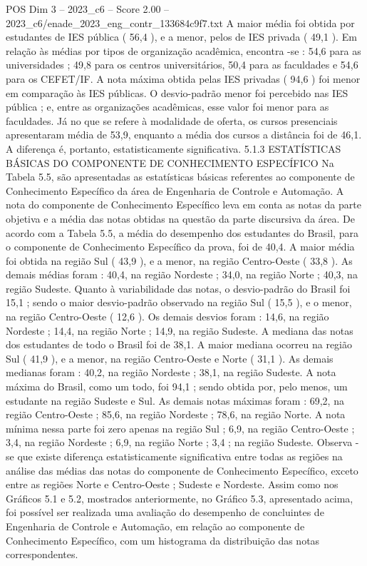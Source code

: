\begin{textsample}{POS Dim 3 – 2023\_c6 – Score 2.00 – 2023\_c6/enade\_2023\_eng\_contr\_133684c9f7.txt}
A maior média foi obtida por estudantes de IES pública ( 56,4 ), e a menor, pelos de IES privada ( 49,1 ).
Em relação às médias por tipos de organização acadêmica, encontra -se : 54,6 para as universidades ; 49,8 para os centros universitários, 50,4 para as faculdades e 54,6 para os CEFET/IF.
A nota máxima obtida pelas IES privadas ( 94,6 ) foi menor em comparação às IES públicas.
O desvio-padrão menor foi percebido nas IES pública ; e, entre as organizações acadêmicas, esse valor foi menor para as faculdades.
Já no que se refere à modalidade de oferta, os cursos presenciais apresentaram média de 53,9, enquanto a média dos cursos a distância foi de 46,1.
A diferença é, portanto, estatisticamente significativa. 5.1.3 ESTATÍSTICAS BÁSICAS DO COMPONENTE DE CONHECIMENTO ESPECÍFICO Na Tabela 5.5, são apresentadas as estatísticas básicas referentes ao componente de Conhecimento Específico da área de Engenharia de Controle e Automação.
A nota do componente de Conhecimento Específico leva em conta as notas da parte objetiva e a média das notas obtidas na questão da parte discursiva da área.
De acordo com a Tabela 5.5, a média do desempenho dos estudantes do Brasil, para o componente de Conhecimento Específico da prova, foi de 40,4.
A maior média foi obtida na região Sul ( 43,9 ), e a menor, na região Centro-Oeste ( 33,8 ).
As demais médias foram : 40,4, na região Nordeste ; 34,0, na região Norte ; 40,3, na região Sudeste.
Quanto à variabilidade das notas, o desvio-padrão do Brasil foi 15,1 ; sendo o maior desvio-padrão observado na região Sul ( 15,5 ), e o menor, na região Centro-Oeste ( 12,6 ).
Os demais desvios foram : 14,6, na região Nordeste ; 14,4, na região Norte ; 14,9, na região Sudeste.
A mediana das notas dos estudantes de todo o Brasil foi de 38,1.
A maior mediana ocorreu na região Sul ( 41,9 ), e a menor, na região Centro-Oeste e Norte ( 31,1 ).
As demais medianas foram : 40,2, na região Nordeste ; 38,1, na região Sudeste.
A nota máxima do Brasil, como um todo, foi 94,1 ; sendo obtida por, pelo menos, um estudante na região Sudeste e Sul.
As demais notas máximas foram : 69,2, na região Centro-Oeste ; 85,6, na região Nordeste ; 78,6, na região Norte.
A nota mínima nessa parte foi zero apenas na região Sul ; 6,9, na região Centro-Oeste ; 3,4, na região Nordeste ; 6,9, na região Norte ; 3,4 ; na região Sudeste.
Observa -se que existe diferença estatisticamente significativa entre todas as regiões na análise das médias das notas do componente de Conhecimento Específico, exceto entre as regiões Norte e Centro-Oeste ; Sudeste e Nordeste.
Assim como nos Gráficos 5.1 e 5.2, mostrados anteriormente, no Gráfico 5.3, apresentado acima, foi possível ser realizada uma avaliação do desempenho de concluintes de Engenharia de Controle e Automação, em relação ao componente de Conhecimento Específico, com um histograma da distribuição das notas correspondentes.

\end{textsample}
